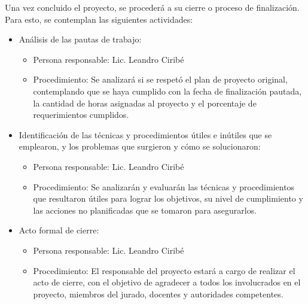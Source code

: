 \documentclass[
11pt, %
]{charter}
\begin{document}
Una vez concluido el proyecto, se procederá a su cierre o proceso de finalización. Para esto, se contemplan las siguientes actividades:
\begin{itemize}
	\item Análisis de las pautas de trabajo:
	\begin{itemize}
		\item Persona responsable: Lic. Leandro Ciribé
		\item Procedimiento: Se analizará si se respetó el plan de proyecto original, contemplando que se haya cumplido con la fecha de finalización pautada, la cantidad de horas asignadas al proyecto y el porcentaje de requerimientos cumplidos.
	 \end{itemize}
	\item Identificación de las técnicas y procedimientos útiles e inútiles que se emplearon, y los problemas que surgieron y cómo se solucionaron:
	\begin{itemize}
		\item Persona responsable: Lic. Leandro Ciribé
		\item Procedimiento: Se analizarán y evaluarán las técnicas y procedimientos que resultaron útiles para lograr los objetivos, su nivel de cumplimiento y las acciones no planificadas que se tomaron para asegurarlos.
	 \end{itemize}
	\item Acto formal de cierre:
	\begin{itemize}
		\item Persona responsable: Lic. Leandro Ciribé
		\item Procedimiento: El responsable del proyecto estará a cargo de realizar el acto de cierre, con el objetivo de agradecer a todos los involucrados en el proyecto, miembros del jurado, docentes y autoridades competentes.
	 \end{itemize}
\end{itemize}
\end{document}
